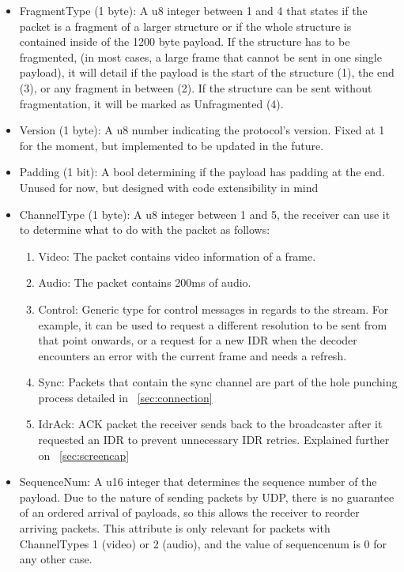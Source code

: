 \documentclass{article}
\begin{document}
\begin{itemize}
    \item FragmentType (1 byte): A u8 integer between 1 and 4 that states if the packet is a fragment of a larger structure or if the whole structure is contained inside of the 1200 byte payload. If the structure has to be fragmented, (in most cases, a large frame that cannot be sent in one single payload), it will detail if the payload is
    the start of the structure (1), the end (3), or any fragment in between (2). If the structure can be sent without fragmentation, it will be marked as Unfragmented (4).
    \item Version (1 byte): A u8 number indicating the protocol's version. Fixed at 1 for the moment, but implemented to be updated in the future.
    \item Padding (1 bit): A bool determining if the payload has padding at the end. Unused for now, but designed with code extensibility in mind
    \item ChannelType (1 byte):  A u8 integer between 1 and 5, the receiver can use it to determine what to do with the packet as follows:
    \begin{enumerate}
        \item Video: The packet contains video information of a frame.
        \item Audio: The packet contains 200ms of audio.
        \item \begin{sloppypar}
                   Control: Generic type for control messages in regards to the stream. For example, it can be used to request a different resolution to be sent from that point onwards, or a request for a new IDR when the decoder encounters an error with the current frame and needs a refresh.
               \end{sloppypar}
        \item Sync: Packets that contain the sync channel are part of the hole punching process detailed in ~\ref{sec:connection}
        \item IdrAck: ACK packet the receiver sends back to the broadcaster after it requested an IDR to prevent unnecessary IDR retries. Explained further on ~\ref{sec:screencap}
    \end{enumerate}
    \item SequenceNum: A u16 integer that determines the sequence number of the payload. Due to the nature of sending packets by UDP, there is no guarantee of an ordered arrival of payloads, so this allows the receiver to reorder arriving packets. This attribute is only relevant for packets with ChannelTypes 1 (video) or 2 (audio), and the value of sequencenum is 0 for any other case. 

\end{itemize}
\end{document}
